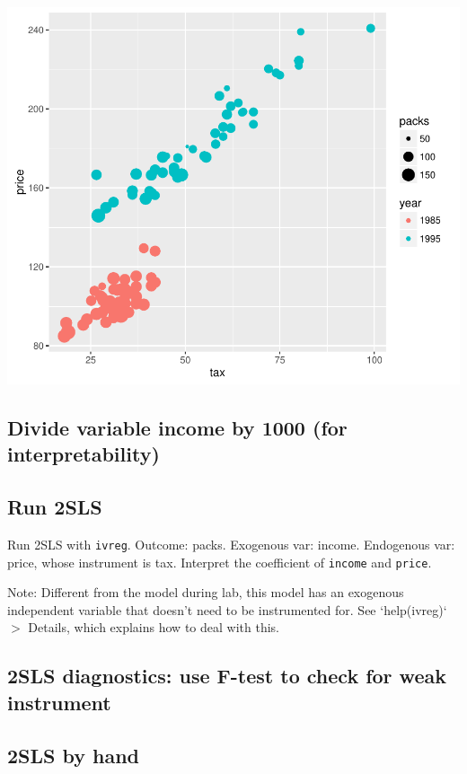 \documentclass{article}\usepackage[]{graphicx}\usepackage[]{color}
\makeatletter
\def\maxwidth{ %
  \ifdim\Gin@nat@width>\linewidth
    \linewidth
  \else
    \Gin@nat@width
  \fi
}
\newenvironment{knitrout}{}{} %
\makeatother
\begin{document}
\begin{knitrout}
\color{fgcolor}
\includegraphics[width=\maxwidth]{figure/unnamed-chunk-2-1} 

\end{knitrout}

\subsection{Divide variable income by 1000 (for interpretability)}

\subsection{Run 2SLS}

Run 2SLS with \verb`ivreg`. Outcome: packs. Exogenous var: income. Endogenous var: price, whose instrument is tax. Interpret the coefficient of \verb`income` and \verb`price`.

Note: Different from the model during lab, this model has an exogenous independent variable that doesn't need to be instrumented for. See `help(ivreg)` $>$ Details, which explains how to deal with this.

\subsection{2SLS diagnostics: use F-test to check for weak instrument}

\subsection{2SLS by hand}
\end{document}
